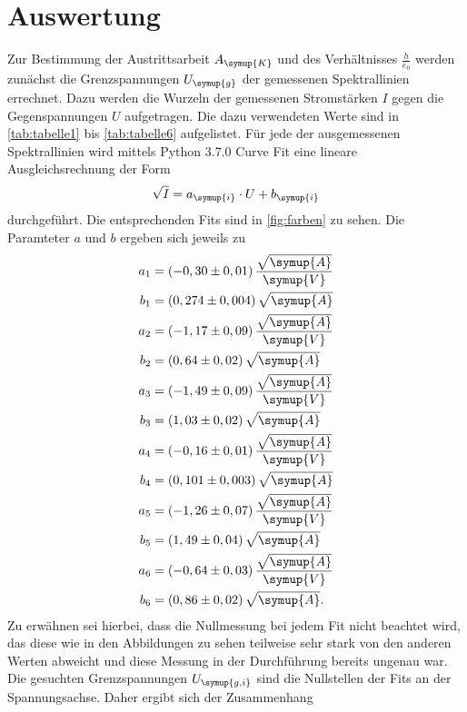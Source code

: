 \section{Auswertung}
\label{sec:Auswertung}
Zur Bestimmung der Austrittsarbeit $A_{\symup{K}}$ und des Verhältnisses $\frac{h}{e_0}$ werden zunächst die Grenzspannungen $U_{\symup{g}}$
der gemessenen Spektrallinien errechnet. Dazu werden die Wurzeln der gemessenen Stromstärken $I$ gegen die Gegenspannungen $U$ aufgetragen.
Die dazu verwendeten Werte sind in \autoref{tab:tabelle1} bis \autoref{tab:tabelle6} aufgelistet. Für jede der ausgemessenen Spektrallinien wird mittels Python 3.7.0 Curve Fit
eine lineare Ausgleichsrechnung der Form 
\begin{equation}
\label{eqn:ausgleich1}
  \sqrt{I} = a_{\symup{i}} \cdot U + b_{\symup{i}} 
\end{equation}
durchgeführt. Die entsprechenden Fits sind in \autoref{fig:farben} zu sehen. Die Paramteter $a$ und $b$ ergeben sich jeweils zu 
\begin{align*}
  a_1 &= (-0,30 \pm 0,01) \, \frac{\sqrt{\symup{A}}}{\symup{V}} \\
  b_1 &= (0,274 \pm 0,004) \, \sqrt{\symup{A}} \\
  a_2 &= (-1,17 \pm 0,09) \, \frac{\sqrt{\symup{A}}}{\symup{V}} \\
  b_2 &= (0,64 \pm 0,02) \,  \sqrt{\symup{A}} \\
  a_3 &= (-1,49 \pm 0,09) \, \frac{\sqrt{\symup{A}}}{\symup{V}} \\
  b_3 &= (1,03 \pm 0,02) \,  \sqrt{\symup{A}} \\
  a_4 &= (-0,16 \pm 0,01) \, \frac{\sqrt{\symup{A}}}{\symup{V}} \\
  b_4 &= (0,101 \pm 0,003) \,\sqrt{\symup{A}} \\
  a_5 &= (-1,26 \pm 0,07) \, \frac{\sqrt{\symup{A}}}{\symup{V}} \\
  b_5 &= (1,49 \pm 0,04) \,  \sqrt{\symup{A}} \\
  a_6 &= (-0,64 \pm 0,03) \, \frac{\sqrt{\symup{A}}}{\symup{V}} \\
  b_6 &= (0,86 \pm 0,02) \,  \sqrt{\symup{A}}. \\
\end{align*} 
Zu erwähnen sei hierbei, dass die Nullmessung bei jedem Fit nicht beachtet wird, das diese wie in den Abbildungen zu sehen teilweise sehr 
stark von den anderen Werten abweicht und diese Messung in der Durchführung bereits ungenau war.
Die gesuchten Grenzspannungen $U_{\symup{g, i}}$ sind die Nullstellen der Fits an der Spannungsachse. Daher ergibt sich der Zusammenhang
